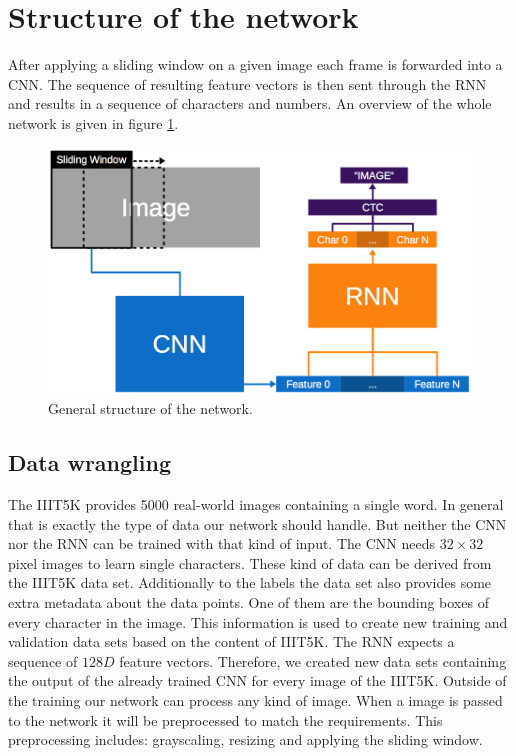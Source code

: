 \documentclass{utue} %
\begin{document}
\section{Structure of the network}

After applying a sliding window on a given image each frame is forwarded into a CNN. The sequence of resulting feature vectors is then sent through the RNN and results in a sequence of characters and numbers. An overview of the whole network is given in figure \ref{fig:model_general}.
\begin{figure}[h]
	\centering
	\includegraphics[width=.9\columnwidth]{graphics/model_general.png}
	\caption{\label{fig:model_general}General structure of the network.}
\end{figure}


\subsection{Data wrangling}
The IIIT5K provides 5000 real-world images containing a single word. In general that is exactly the type of data our network should handle. But neither the CNN nor the RNN can be trained with that kind of input. The CNN needs $32\times32$ pixel images to learn single characters. These kind of data can be derived from the IIIT5K data set. Additionally to the labels the data set also provides some extra metadata about the data points. One of them are the bounding boxes of every character in the image. This information is used to create  new training and validation data sets based on the content of IIIT5K. The RNN expects a sequence of $128D$ feature vectors. Therefore, we created new data sets containing the output of the already trained CNN for every image of the IIIT5K. 
Outside of the training our network can process any kind of image. When a image is passed to the network it will be preprocessed to match the requirements. This preprocessing includes: grayscaling, resizing and applying the sliding window.
\end{document}
